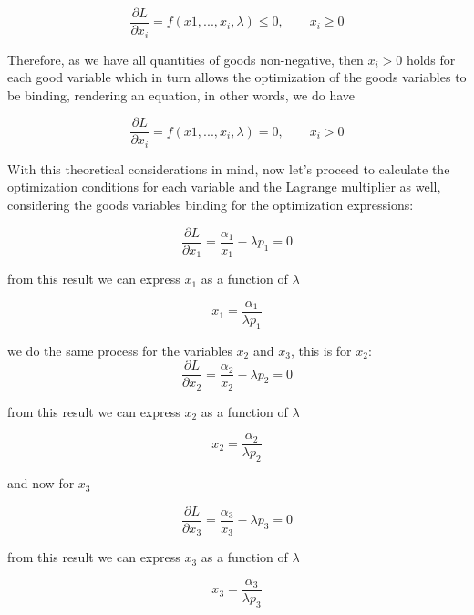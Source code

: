 \documentclass{article}
\begin{document}
\begin{equation}
  \frac{\partial L}{\partial x_i} = f(x1, ..., x_i, \lambda) \leq 0, \qquad x_i \geq 0
\end{equation}

Therefore, as we have all quantities of goods non-negative, then $x_i > 0$ holds for each good variable which in turn allows the optimization of the goods variables to be binding, rendering an equation, in other words, we do have

\begin{equation}
  \frac{\partial L}{\partial x_i} = f(x1, ...,x_i, \lambda) = 0, \qquad x_i > 0
\end{equation}

With this theoretical considerations in mind, now let's proceed to calculate the optimization conditions for each variable and the Lagrange multiplier as well, considering the goods variables binding for the optimization expressions:

\begin{equation}
  \frac{\partial L}{\partial x_1} = \frac{\alpha_1}{x_1} - \lambda p_1 = 0
\end{equation}

from this result we can express $x_1$ as a function of $\lambda$

\begin{equation}
  x_1 = \frac{\alpha_1}{\lambda p_1}
\end{equation}

we do the same process for the variables $x_2$ and $x_3$, this is for $x_2$:
\begin{equation}
  \frac{\partial L}{\partial x_2} = \frac{\alpha_2}{x_2} - \lambda p_2 = 0
\end{equation}

from this result we can express $x_2$ as a function of $\lambda$

\begin{equation}
  x_2 = \frac{\alpha_2}{\lambda p_2}
\end{equation}

and now for $x_3$

\begin{equation}
  \frac{\partial L}{\partial x_3} = \frac{\alpha_3}{x_3} - \lambda p_3 = 0
\end{equation}

from this result we can express $x_3$ as a function of $\lambda$

\begin{equation}
  x_3 = \frac{\alpha_3}{\lambda p_3}
\end{equation}
\end{document}
